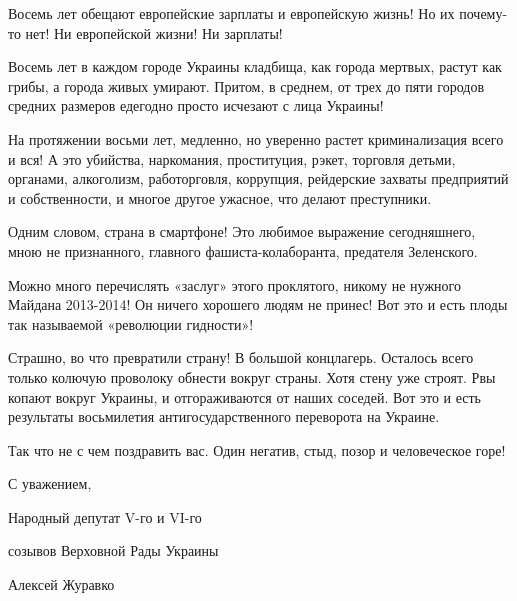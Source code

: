 Восемь лет обещают европейские зарплаты и европейскую жизнь! Но их почему-то
нет! Ни европейской жизни! Ни зарплаты!

Восемь лет в каждом городе Украины кладбища, как города мертвых, растут как
грибы, а города живых умирают. Притом, в среднем, от трех до пяти городов
средних размеров едегодно просто исчезают с лица Украины!

На протяжении восьми лет, медленно, но уверенно растет криминализация всего и
вся! А это убийства, наркомания, проституция, рэкет, торговля детьми, органами,
алкоголизм, работорговля, коррупция, рейдерские захваты предприятий и
собственности, и многое другое ужасное, что делают преступники. 

Одним словом, страна в смартфоне! Это любимое выражение сегодняшнего, мною не
признанного, главного фашиста-колаборанта, предателя Зеленского. 

Можно много перечислять «заслуг» этого проклятого, никому не нужного Майдана
2013-2014! Он ничего хорошего людям не принес! Вот это и есть плоды так
называемой «революции гидности»!

Страшно, во что превратили страну! В большой концлагерь. Осталось всего только
колючую проволоку обнести вокруг страны. Хотя стену уже строят. Рвы копают
вокруг Украины, и отгораживаются от наших соседей. Вот это и есть результаты
восьмилетия антигосударственного переворота на Украине.

Так что не с чем поздравить вас. Один негатив, стыд, позор и человеческое горе!

С уважением,  

Народный депутат V-го и VI-го

созывов Верховной Рады Украины

Алексей Журавко

